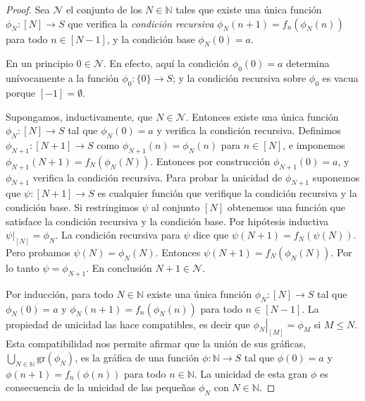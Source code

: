 \documentclass{report}
\newcommand{\naturalNumbers}{\mathbb{N}}
\begin{document}
  \begin{proof}
    Sea \(\mathcal{N}\) el conjunto de los \(N \in \naturalNumbers\) tales que existe una única función \(\phi_N : [N] \rightarrow S\) que verifica la \emph{condición recursiva} \(\phi_N(n + 1) = f_n ( \phi_N(n))\) para todo \(n \in [N - 1]\), y la condición base \(\phi_N(0) = a\).

    En un principio \(0 \in \mathcal{N}\).
    En efecto, aquí la condición \(\phi_0(0) = a\) determina unívocamente a la función \(\phi_0 : \{0\} \rightarrow S\);
    y la condición recursiva sobre \(\phi_0\) es vacua porque \([- 1] = \emptyset\).

    Supongamos, inductivamente, que \(N \in \mathcal{N}\).
    Entonces existe una única función \(\phi_N : [N] \rightarrow S\) tal que \(\phi_N(0) = a\) y verifica la condición recursiva.
    Definimos \(\phi_{N + 1} : [N + 1] \rightarrow S\) como \(\phi_{N + 1}(n) = \phi_N(n)\) para \(n \in [N]\), e imponemos \(\phi_{N + 1}(N + 1) = f_N(\phi_N(N))\).
    Entonces por construcción \(\phi_{N + 1}(0) = a\), y \(\phi_{N + 1}\) verifica la condición recursiva.
    Para probar la unicidad de \(\phi_{N + 1}\) suponemos que \(\psi : [N + 1] \rightarrow S\) es cualquier función que verifique la condición recursiva y la condición base.
    Si restringimos \(\psi\) al conjunto \([N]\) obtenemos una función que satisface la condición recursiva y la condición base.
    Por hipótesis inductiva \(\left. \psi \right|_{[N]} = \phi_N\).
    La condición recursiva para \(\psi\) dice que \(\psi(N + 1) = f_N(\psi(N))\).
    Pero probamos \(\psi(N) = \phi_N(N)\).
    Entonces \(\psi(N + 1) = f_N(\phi_N(N))\).
    Por lo tanto \(\psi = \phi_{N + 1}\).
    En conclusión \(N + 1 \in \mathcal{N}\).

    Por inducción, para todo \(N \in \naturalNumbers\) existe una única función \(\phi_N : [N] \rightarrow S\) tal que \(\phi_N(0) = a\) y \(\phi_N(n + 1) = f_n ( \phi_N(n))\) para todo \(n \in [N - 1]\).
    La propiedad de unicidad las hace compatibles, es decir que \(\left. \phi_N \right|_{[M]} = \phi_M\) si \(M \leq N\).
    Esta compatibilidad nos permite afirmar que la unión de sus gráficas, \(\bigcup_{N \in \naturalNumbers} \text{gr}(\phi_N)\), es la gráfica de una función \(\phi : \naturalNumbers \rightarrow S\) tal que \(\phi(0) = a\) y \(\phi(n + 1) = f_n(\phi(n))\) para todo \( n \in \naturalNumbers\).
    La unicidad de esta gran \(\phi\) es consecuencia de la unicidad de las pequeñas \(\phi_N\) con \(N \in \naturalNumbers\).
  \end{proof}
\end{document}

